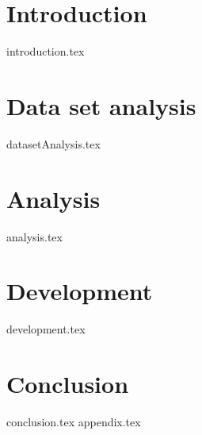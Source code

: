 \documentclass[
    nolot,
    color,   %
	table,   %
    twoside, %
]{fithesis/fithesis3}
\begin{document}
  \pagestyle{plain}
  
  \chapter{Introduction}
  {introduction.tex}
  \chapter{Data set analysis}
  {datasetAnalysis.tex}
  \chapter{Analysis}
  {analysis.tex}
  \chapter{Development}
  {development.tex}  
  \chapter{Conclusion}
  {conclusion.tex}
  {}
  {appendix.tex}
\end{document}
